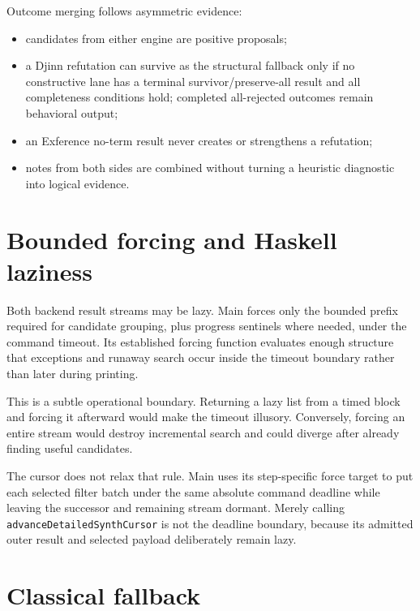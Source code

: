 \documentclass[10pt,letterpaper,oneside]{report}
\begin{document}
Outcome merging follows asymmetric evidence:

\begin{itemize}
  \item candidates from either engine are positive proposals;
  \item a Djinn refutation can survive as the structural fallback only if no constructive lane has a terminal survivor/preserve-all result and all completeness conditions hold; completed all-rejected outcomes remain behavioral output;
  \item an Exference no-term result never creates or strengthens a refutation;
  \item notes from both sides are combined without turning a heuristic diagnostic into logical evidence.
\end{itemize}

\section{Bounded forcing and Haskell laziness}

Both backend result streams may be lazy. Main forces only the bounded prefix required for candidate grouping, plus progress sentinels where needed, under the command timeout. Its established forcing function evaluates enough structure that exceptions and runaway search occur inside the timeout boundary rather than later during printing.

This is a subtle operational boundary. Returning a lazy list from a timed block and forcing it afterward would make the timeout illusory. Conversely, forcing an entire stream would destroy incremental search and could diverge after already finding useful candidates.

The cursor does not relax that rule. Main uses its step-specific force target to
put each selected filter batch under the same absolute command deadline while
leaving the successor and remaining stream dormant. Merely calling
\nolinkurl{advanceDetailedSynthCursor} is not the deadline boundary, because its
admitted outer result and selected payload deliberately remain lazy.

\section{Classical fallback}
\end{document}
